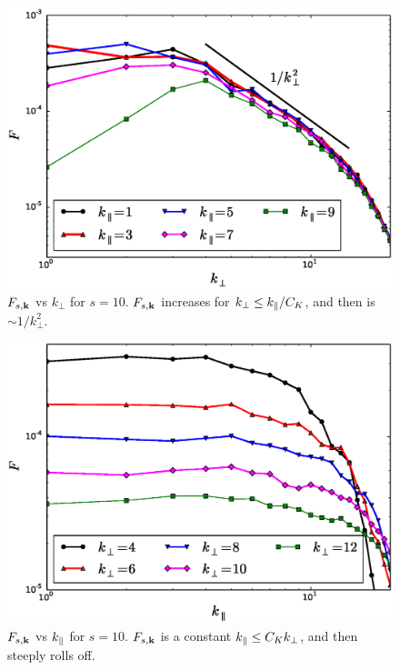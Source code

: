     \begin{figure}
    \begin{center}
        \includegraphics[width=14.8cm]{figs/phmixnl/M900_m100_vskp.eps}
        \caption{$F_{s,\mathbf{k}}$ vs $k_\perp$ for $s=10$. $F_{s,\mathbf{k}}$ increases for $k_\perp \leq k_\parallel/C_K$, and
        then is $\sim 1/k_\perp^2$.}
        \label{phmixnl:fig:m100f:vskp}
    \end{center}
    \end{figure}
    \begin{figure}
    \begin{center}
        \includegraphics[width=14.8cm]{figs/phmixnl/M900_m100_vskz.eps}
        \caption{$F_{s,\mathbf{k}}$ vs $k_\parallel$ for $s=10$. $F_{s,\mathbf{k}}$ is a constant $k_\parallel \leq C_K k_\perp$, and
        then steeply rolls off.}
        \label{phmixnl:fig:m100f:vskz}
    \end{center}
    \end{figure}

